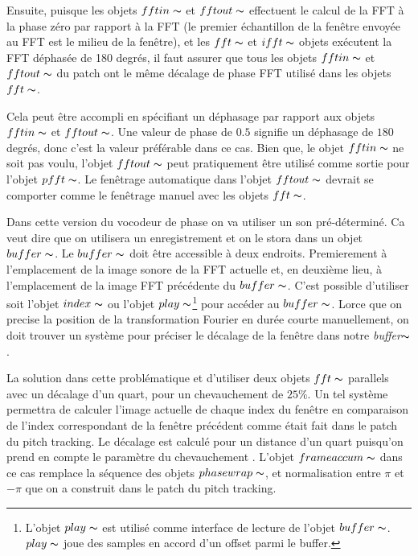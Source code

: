 Ensuite, puisque les objets $fftin\thicksim$ et $fftout\thicksim$ effectuent le calcul de la FFT à la phase zéro par rapport à la FFT (le premier échantillon de la fenêtre envoyée au FFT est le milieu de la fenêtre), et les $fft\thicksim$ et $ifft\thicksim$ objets exécutent la FFT déphasée de 180 degrés, il faut assurer que tous les objets $fftin\thicksim$ et $fftout\thicksim$ du patch ont le même décalage de phase FFT utilisé dans les objets $fft\thicksim$.

Cela peut être accompli en spécifiant un déphasage par rapport aux objets $fftin\thicksim$ et $fftout\thicksim$. Une valeur de phase de $0.5$ signifie un déphasage de $180$ degrés, donc c'est la valeur préférable dans ce cas. Bien que, le objet $fftin\thicksim$ ne soit pas voulu, l'objet $fftout\thicksim$ peut pratiquement être utilisé comme sortie pour l'objet $pfft\thicksim$. Le fenêtrage automatique dans l'objet $fftout\thicksim$ devrait se comporter comme le fenêtrage manuel avec les objets $fft\thicksim$.

Dans cette version du vocodeur de phase on va utiliser un son pré-déterminé. Ca veut dire que on utilisera un enregistrement et on le stora dans un objet $buffer\thicksim$. Le $buffer\thicksim$ doit être accessible à deux endroits. Premierement à l'emplacement de la image sonore de la FFT actuelle et, en deuxième lieu, à l'emplacement de la image FFT précédente du $buffer\thicksim$. C'est possible d'utiliser soit l'objet $index\thicksim$ ou l'objet $play\thicksim$\footnote{L'objet $play\thicksim$ est utilisé comme interface de lecture de l'objet $buffer\thicksim$. $play\thicksim$ joue des samples en accord d'un offset parmi le buffer.} pour accéder au $buffer\thicksim$. Lorce que on precise la position de la transformation Fourier en durée courte manuellement, on doit trouver un système pour préciser le décalage de la fenêtre dans notre \textit{buffer}$\thicksim$.

La solution dans cette problématique et d'utiliser deux objets $fft\thicksim$ parallels avec un décalage d'un quart, pour un chevauchement de $25 \%$. Un tel système permettra de calculer l'image actuelle de chaque index du fenêtre en comparaison de l'index correspondant de la fenêtre précédent comme était fait dans le patch du pitch tracking. Le décalage est calculé pour un distance d'un quart puisqu'on prend en compte le paramètre du chevauchement . L'objet $frameaccum\thicksim$ dans ce cas remplace la séquence des objets $phasewrap\thicksim$, et normalisation entre $\pi$ et $-\pi$ que on a construit dans le patch du pitch tracking.

